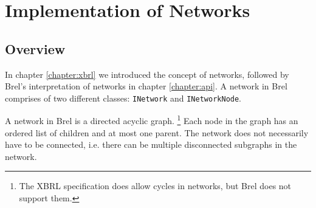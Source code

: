 \section{Implementation of Networks}
\label{sec:implementation_networks}

\subsection{Overview}

In chapter \ref{chapter:xbrl} we introduced the concept of networks,
followed by Brel's interpretation of networks in chapter \ref{chapter:api}.
A network in Brel comprises of two different classes: \texttt{INetwork} and \texttt{INetworkNode}.

A network in Brel is a directed acyclic graph.
\footnote{The XBRL specification does allow cycles in networks, but Brel does not support them.}
Each node in the graph has an ordered list of children and at most one parent.
The network does not necessarily have to be connected, i.e. there can be multiple disconnected subgraphs in the network.

